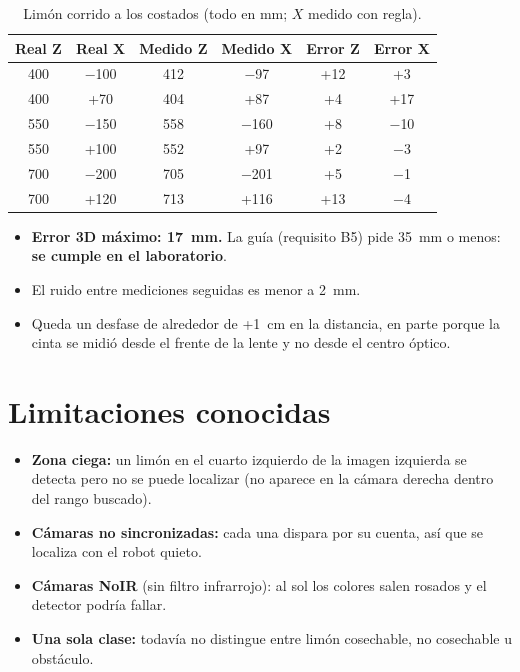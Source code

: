 \documentclass[11pt,a4paper]{article}
\begin{document}
\begin{table}[H]
\centering
\begin{tabular}{@{}cccccc@{}}
\toprule
\textbf{Real Z} & \textbf{Real X} & \textbf{Medido Z} & \textbf{Medido X} & \textbf{Error Z} & \textbf{Error X} \\
\midrule
400 & $-$100 & 412 & $-$97 & +12 & +3 \\
400 & +70 & 404 & +87 & +4 & +17 \\
550 & $-$150 & 558 & $-$160 & +8 & $-$10 \\
550 & +100 & 552 & +97 & +2 & $-$3 \\
700 & $-$200 & 705 & $-$201 & +5 & $-$1 \\
700 & +120 & 713 & +116 & +13 & $-$4 \\
\bottomrule
\end{tabular}
\caption{Limón corrido a los costados (todo en mm; $X$ medido con regla).}
\end{table}

\begin{itemize}
  \item \textbf{Error 3D máximo: 17~mm.} La guía (requisito B5) pide 35~mm o menos: \textbf{se cumple en el
        laboratorio}.
  \item El ruido entre mediciones seguidas es menor a 2~mm.
  \item Queda un desfase de alrededor de +1~cm en la distancia, en parte porque la cinta se midió desde el frente de
        la lente y no desde el centro óptico.
\end{itemize}

\section{Limitaciones conocidas}
\begin{itemize}
  \item \textbf{Zona ciega:} un limón en el cuarto izquierdo de la imagen izquierda se detecta pero no se puede
        localizar (no aparece en la cámara derecha dentro del rango buscado).
  \item \textbf{Cámaras no sincronizadas:} cada una dispara por su cuenta, así que se localiza con el robot quieto.
  \item \textbf{Cámaras NoIR} (sin filtro infrarrojo): al sol los colores salen rosados y el detector podría fallar.
  \item \textbf{Una sola clase:} todavía no distingue entre limón cosechable, no cosechable u obstáculo.
\end{itemize}
\end{document}
